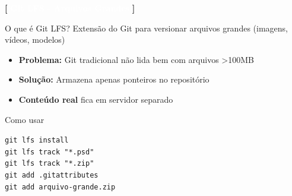 \documentclass[10pt, brazil]{beamer}
\begin{document}
\begin{frame}{\textcolor{lightpurple}{\textbf{[}} \textbf{\textcolor{white}{Git LFS - Arquivos Grandes}} \textcolor{lightpurple}{\textbf{]}}}
  
  \begin{block}{O que é Git LFS?}
    Extensão do Git para versionar arquivos grandes (imagens, vídeos, modelos)
  \end{block}

  \vspace{1em}

  \begin{itemize}
    \item \textbf{Problema:} Git tradicional não lida bem com arquivos >100MB
    \item \textbf{Solução:} Armazena apenas ponteiros no repositório
    \item \textbf{Conteúdo real} fica em servidor separado
  \end{itemize}

  \vspace{1em}

  \begin{block}{Como usar}
    \begin{scriptsize}
      \texttt{git lfs install}\\
      \texttt{git lfs track "*.psd"}\\
      \texttt{git lfs track "*.zip"}\\
      \texttt{git add .gitattributes}\\
      \texttt{git add arquivo-grande.zip}
    \end{scriptsize}
  \end{block}

\end{frame}
\end{document}
